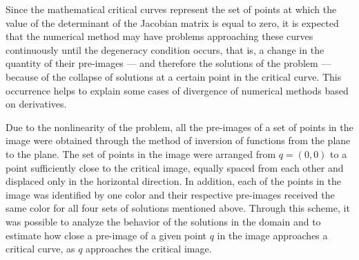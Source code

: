 \documentclass[journal=iecred,manuscript=article]{achemso}
\theoremstyle{definition}
\theoremstyle{remark}
\begin{document}
Since the mathematical critical curves represent the set of points at which the value of the determinant of the Jacobian matrix is equal to zero, it is expected that the numerical method may have problems approaching these curves continuously until the degeneracy condition occurs, that is, a change in the quantity of their pre-images --- and therefore the solutions of the problem --- because of the collapse of solutions at a certain point in the critical curve. This occurrence helps to explain some cases of divergence of numerical methods based on derivatives.

Due to the nonlinearity of the problem, all the pre-images of a set of points in the image were obtained through the method of inversion of functions from the plane to the plane. The set of points in the image were arranged from $ q = \left(0,0\right) $ to a point sufficiently close to the critical image, equally spaced from each other and displaced only in the horizontal direction. In addition, each of the points in the image was identified by one color and their respective pre-images received the same color for all four sets of solutions mentioned above. Through this scheme, it was possible to analyze the behavior of the solutions in the domain and to estimate how close a pre-image of a given point $ q $ in the image approaches a critical curve, as $ q $ approaches the critical image.
\end{document}
